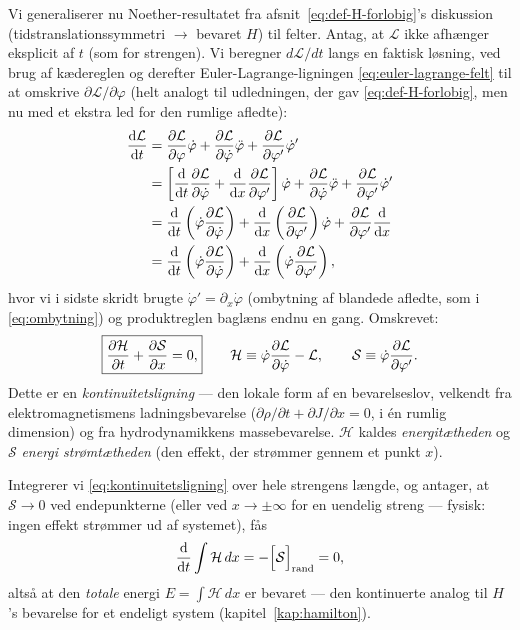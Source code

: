 Vi generaliserer nu Noether-resultatet fra
afsnit~\ref{eq:def-H-forlobig}'s diskussion (tidstranslationssymmetri
$\to$ bevaret $H$) til felter. Antag, at $\mathcal{L}$ ikke afhænger
eksplicit af $t$ (som for strengen). Vi beregner $d\mathcal{L}/dt$
langs en faktisk løsning, ved brug af kædereglen og derefter
Euler-Lagrange-ligningen \eqref{eq:euler-lagrange-felt} til at
omskrive $\partial\mathcal{L}/\partial\varphi$ (helt analogt til
udledningen, der gav \eqref{eq:def-H-forlobig}, men nu med et ekstra
led for den rumlige afledte):
\begin{align}
  \dv{\mathcal{L}}{t} &= \pdv{\mathcal{L}}{\varphi}\dot\varphi
    + \pdv{\mathcal{L}}{\dot\varphi}\ddot\varphi + \pdv{\mathcal{L}}{\varphi'}\dot\varphi' \\
  &= \left[\dv{}{t}\pdv{\mathcal{L}}{\dot\varphi} + \dv{}{x}\pdv{\mathcal{L}}{\varphi'}\right]\dot\varphi
    + \pdv{\mathcal{L}}{\dot\varphi}\ddot\varphi + \pdv{\mathcal{L}}{\varphi'}\dot\varphi' \\
  &= \dv{}{t}\left(\dot\varphi\pdv{\mathcal{L}}{\dot\varphi}\right)
    + \dv{}{x}\left(\pdv{\mathcal{L}}{\varphi'}\right)\dot\varphi + \pdv{\mathcal{L}}{\varphi'}\dv{}{x}(\dot\varphi) \\
  &= \dv{}{t}\left(\dot\varphi\pdv{\mathcal{L}}{\dot\varphi}\right)
    + \dv{}{x}\left(\dot\varphi\pdv{\mathcal{L}}{\varphi'}\right),
\end{align}
hvor vi i sidste skridt brugte $\dot\varphi'=\partial_x\dot\varphi$
(ombytning af blandede afledte, som i \eqref{eq:ombytning}) og
produktreglen baglæns endnu en gang. Omskrevet:
\begin{equation}
  \boxed{\pdv{\mathcal{H}}{t} + \pdv{\mathcal{S}}{x} = 0,}
  \qquad
  \mathcal{H} \equiv \dot\varphi\pdv{\mathcal{L}}{\dot\varphi} - \mathcal{L},
  \qquad
  \mathcal{S} \equiv \dot\varphi\pdv{\mathcal{L}}{\varphi'}.
  \label{eq:kontinuitetsligning}
\end{equation}
Dette er en \emph{kontinuitetsligning} — den lokale form af en
bevarelseslov, velkendt fra elektromagnetismens ladningsbevarelse
($\partial\rho/\partial t+\partial J/\partial x=0$, i én rumlig
dimension) og fra hydrodynamikkens massebevarelse. $\mathcal{H}$
kaldes \emph{energitætheden} og $\mathcal{S}$ \emph{energi\-
strømtætheden} (den effekt, der strømmer gennem et punkt $x$).

Integrerer vi \eqref{eq:kontinuitetsligning} over hele strengens
længde, og antager, at $\mathcal{S}\to0$ ved endepunkterne (eller ved
$x\to\pm\infty$ for en uendelig streng — fysisk: ingen effekt
strømmer ud af systemet), fås
\begin{equation}
  \dv{}{t}\int\mathcal{H}\,dx = -\Bigl[\mathcal{S}\Bigr]_{\text{rand}} = 0,
\end{equation}
altså at den \emph{totale} energi $E=\int\mathcal{H}\,dx$ er bevaret —
den kontinuerte analog til $H$'s bevarelse for et endeligt system
(kapitel~\ref{kap:hamilton}).

